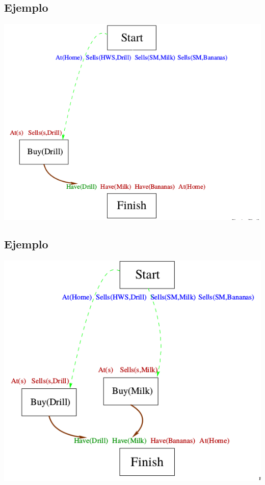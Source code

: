 \documentclass[11pt]{article}
\begin{document}
\subsection*{Ejemplo}
\label{sec:orgd842d81}

\begin{center}
\includegraphics[width=.9\linewidth]{imagenes/pop2.png}
\end{center}

\subsection*{Ejemplo}
\label{sec:org72382f9}

\begin{center}
\includegraphics[width=.9\linewidth]{imagenes/pop4.png}
\end{center}
\end{document}
